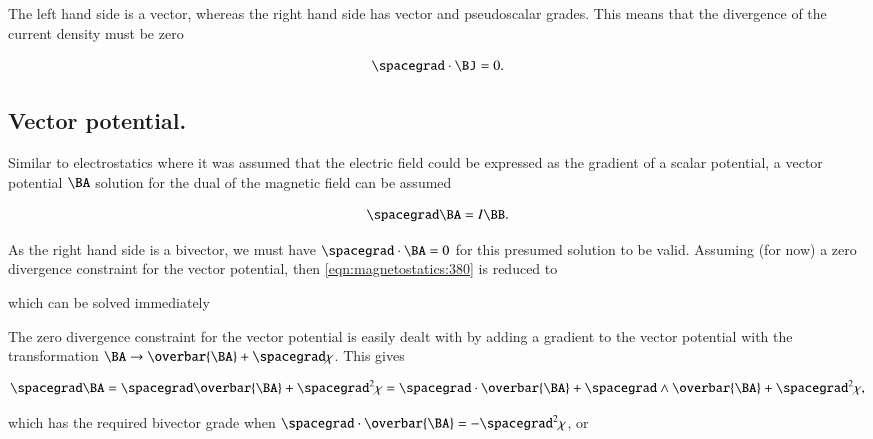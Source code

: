The left hand side is a vector, whereas the right hand side has vector and pseudoscalar grades.
This means that the divergence of the current density must be zero

\begin{dmath}\label{eqn:magnetostatics:460}
\spacegrad \cdot \BJ = 0.
\end{dmath}

\subsection{Vector potential.}

Similar to electrostatics where it was assumed that the electric field could be expressed as the gradient of a scalar potential,
a vector potential \( \BA \) solution for the dual of the magnetic field can be assumed

\begin{dmath}\label{eqn:magnetostatics:480}
\spacegrad \BA = I \BB.
\end{dmath}

As the right hand side is a bivector, we must have \( \spacegrad \cdot \BA = 0 \) for this presumed solution to be valid.
Assuming (for now) a zero divergence constraint for the vector potential, then \cref{eqn:magnetostatics:380} is reduced to


which can be solved immediately


The zero divergence constraint for the vector potential is easily dealt with by adding a gradient to the vector potential with the
transformation \( \BA \rightarrow \overbar{\BA} + \spacegrad \chi \).  This gives

\begin{dmath}\label{eqn:magnetostatics:500}
\spacegrad \BA
=
\spacegrad \overbar{\BA} + \spacegrad^2 \chi
=
\spacegrad \cdot \overbar{\BA} + \spacegrad \wedge \overbar{\BA} + \spacegrad^2 \chi,
\end{dmath}

which has the required bivector grade when \( \spacegrad \cdot \overbar{\BA} = -\spacegrad^2 \chi \), or

